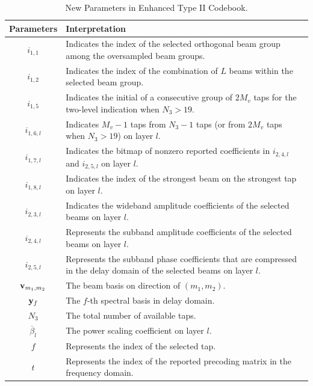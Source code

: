 \documentclass[lettersize,journal]{IEEEtran}
\begin{document}
\begin{table}[t]   
\begin{center} 
\centering  
\captionsetup{
  labelsep=newline, %
}
\renewcommand{\arraystretch}{1.5}  %
\caption{New Parameters in Enhanced Type II Codebook.}  
\label{paraEtypeii} 
\begin{tabular}{|c|m{6cm}|}   
\hline   \textbf{Parameters} &\textbf{Interpretation} \\  
\hline   $i_{1,1}$ &  Indicates the index of the selected orthogonal beam group among the oversampled beam groups. \\
\hline   $i_{1,2}$ &  Indicates the index of the combination of $L$ beams within the selected beam group. \\
\hline   $i_{1,5}$ & Indicates the initial of a consecutive group of $2M_v$ taps for the two-level indication when $N_3 >19$.\\
\hline   $i_{1,6,l}$ & Indicates $M_v-1$ taps from $N_3-1$ taps (or from $2M_v$ taps when $N_3>19$) on layer \(l\).\\
\hline   $i_{1,7,l}$ & Indicates the bitmap of nonzero reported coefficients in $i_{2,4,l}$ and $i_{2,5,l}$ on layer \(l\).\\
\hline   $i_{1,8,l}$ & Indicates the index of the strongest beam on the strongest tap on layer \(l\).\\
\hline   $i_{2,3,l}$ &  Indicates the wideband amplitude coefficients of the selected beams on layer \(l\). \\
\hline   $i_{2,4,l}$ & Represents the subband amplitude coefficients  of the selected beams on layer \(l\). \\
\hline   $i_{2,5,l}$ & Represents the subband phase coefficients that are compressed in the delay domain of the selected beams on layer \(l\). \\
\hline   ${\bf{v}}_{{m_1},m_2}$ & The beam basis on direction of $({m_1},m_2).$ \\
\hline   ${\bf{y}}_{f}$ & The $f$-th spectral basis in delay domain.  \\
\hline   ${N_3}$ & The total number of available taps.\\
\hline   ${\overline \beta  _l}$ & The power scaling coefficient on layer \(l\).\\
\hline   $f$ & Represents the index of the selected tap.\\
\hline   $t$ & Represents the index of the reported precoding matrix in the frequency domain.\\

\end{tabular}
\end{center}
\end{table}
\end{document}
